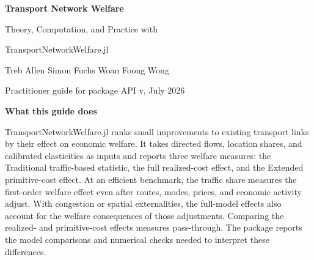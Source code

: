 \documentclass[11pt]{article}
\begin{document}
\hypersetup{pageanchor=false}
\begin{titlepage}
\thispagestyle{empty}
\vspace*{0.55in}
\noindent{\color{guideblue}\rule{\textwidth}{1.2pt}\par}
\vspace{1.15em}
{\Huge\bfseries Transport Network Welfare\footnotemark[1]\par}
\vspace{0.55em}
{\Large Theory, Computation, and Practice with\par}
\vspace{0.12em}
{\Large\ttfamily TransportNetworkWelfare.jl\par}
\vspace{1.75em}
{\large Treb Allen \quad Simon Fuchs \quad Woan Foong Wong\par}
\vspace{0.4em}
{\color{black!60}Practitioner guide for package API v\PackageVersion, July 2026\par}

\vfill
\begin{minipage}{0.93\textwidth}
{\large\bfseries\color{guideblue}What this guide does\par}
\vspace{0.65em}
TransportNetworkWelfare.jl ranks small improvements to existing transport
links by their effect on economic welfare. It takes directed flows, location
shares, and calibrated elasticities as inputs and reports three welfare
measures: the Traditional traffic-based statistic, the full realized-cost
effect, and the Extended primitive-cost effect. At an efficient benchmark, the
traffic share measures the first-order welfare effect even after routes, modes,
prices, and economic activity adjust. With congestion or spatial externalities,
the full-model effects also account for the welfare consequences of those
adjustments. Comparing the realized- and primitive-cost effects measures
pass-through. The package reports the model comparisons and numerical checks
needed to interpret these differences.


\end{minipage}
\end{titlepage}
\end{document}
